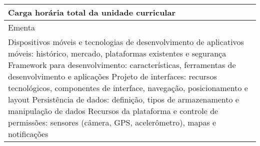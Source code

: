 \begin{quadro}[ht!]
\begin{tabular}{|p{3cm} p{2cm} p{3cm} p{2cm} p{3cm} p{2cm}|}
\multicolumn{5}{|p{13cm}|}{\cellcolor{blue1} Carga horária total da unidade curricular} & \multicolumn{1}{p{1cm}|}{\raggedleft 60	}\\\hline
\multicolumn{6}{|p{15cm}|}{\cellcolor{blue1} Ementa} \\\hline
\hline\multicolumn{6}{|p{15cm}|}{\scriptsize Dispositivos móveis e tecnologias de desenvolvimento de aplicativos móveis: histórico, mercado, plataformas existentes e segurança Framework para desenvolvimento: características, ferramentas de desenvolvimento e aplicações Projeto de interfaces: recursos tecnológicos, componentes de interface, navegação, posicionamento e layout Persistência de dados: definição, tipos de armazenamento e manipulação de dados Recursos da plataforma e controle de permissões: sensores (câmera, GPS, acelerômetro), mapas e notificações}\\\hline
\hline
	\end{tabular}
\end{quadro}
